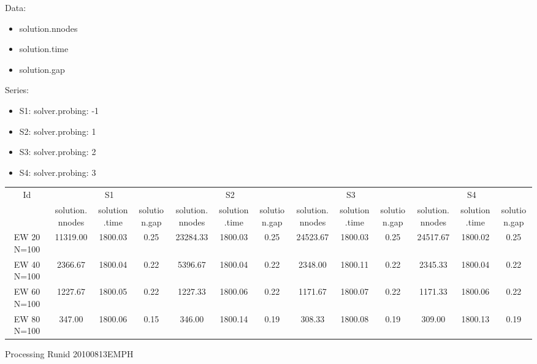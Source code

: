 \documentclass[landscape, 12pt]{report}
\begin{document}
Data:
\begin{itemize}
\item solution.nnodes
\item solution.time
\item solution.gap
\end{itemize}
Series:
\begin{itemize}
\item S1: solver.probing: -1
\item S2: solver.probing: 1
\item S3: solver.probing: 2
\item S4: solver.probing: 3
\end{itemize}
\begin{tabular}{|c|ccc|ccc|ccc|ccc|}
\hline
\multicolumn{1}{|c|}{Id} & \multicolumn{3}{|c|}{S1} & \multicolumn{3}{|c|}{S2} & \multicolumn{3}{|c|}{S3} & \multicolumn{3}{|c|}{S4}
\\
 & solution.nnodes & solution.time & solution.gap & solution.nnodes & solution.time & solution.gap & solution.nnodes & solution.time & solution.gap & solution.nnodes & solution.time & solution.gap
\\
\hline
EW 20 N=100 & 11319.00 & 1800.03 & 0.25 & 23284.33 & 1800.03 & 0.25 & 24523.67 & 1800.03 & 0.25 & 24517.67 & 1800.02 & 0.25
\\
EW 40 N=100 & 2366.67 & 1800.04 & 0.22 & 5396.67 & 1800.04 & 0.22 & 2348.00 & 1800.11 & 0.22 & 2345.33 & 1800.04 & 0.22
\\
EW 60 N=100 & 1227.67 & 1800.05 & 0.22 & 1227.33 & 1800.06 & 0.22 & 1171.67 & 1800.07 & 0.22 & 1171.33 & 1800.06 & 0.22
\\
EW 80 N=100 & 347.00 & 1800.06 & 0.15 & 346.00 & 1800.14 & 0.19 & 308.33 & 1800.08 & 0.19 & 309.00 & 1800.13 & 0.19
\\
\hline 
 \end{tabular}
 
 Processing Runid 20100813EMPH
\end{document}
